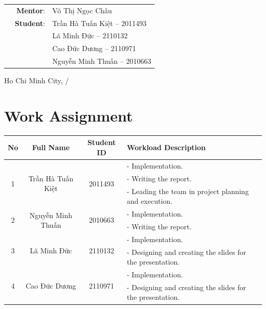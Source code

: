 \documentclass[12pt,a4paper]{article}
\begin{document}
\begin{titlepage}
    \vspace{1cm}
    \begin{table}[H]
        \begin{tabular}{rrl}
        \hspace{5 cm} & \textbf{Mentor}: & Võ Thị Ngọc Châu\\
        
        & \textbf{Student}: & Trần Hà Tuấn Kiệt -- 2011493 \\
        & & Lã Minh Đức -- 2110132 \\
        & & Cao Đức Dương -- 2110971 \\
        & & Nguyễn Minh Thuấn -- 2010663 \\
        
        \end{tabular}
        \end{table}
    \vspace{1cm}

    \begin{center}
        {\large Ho Chi Minh City, \the\month/\the\year}
    \end{center}
\end{titlepage}

\section*{Work Assignment}
\begin{table}[h]
    \centering
    \renewcommand{\arraystretch}{1.5}
    \begin{tabular}{|c|c|c|l|}
    \hline
    \textbf{No} & \textbf{Full Name} & \textbf{Student ID} & \textbf{Workload Description} \\
    \hline 
    \multirow{3}{*}{1} & \multirow{3}{*}{Trần Hà Tuấn Kiệt} & \multirow{3}{*}{2011493} & - Implementation.\\
    & & & - Writing the report.\\
    & & & - Leading the team in project planning and execution. \\
    \hline
    \multirow{2}{*}{2} & \multirow{2}{*}{Nguyễn Minh Thuấn} & \multirow{2}{*}{2010663} & - Implementation.\\
    & & & - Writing the report. \\
    \hline
    \multirow{2}{*}{3} & \multirow{2}{*}{Lã Minh Đức} & \multirow{2}{*}{2110132} & - Implementation.\\
    & & & - Designing and creating the slides for the presentation.\\
    \hline
    \multirow{2}{*}{4} & \multirow{2}{*}{Cao Đức Dương} & \multirow{2}{*}{2110971} & - Implementation.\\
    & & & - Designing and creating the slides for the presentation.\\
    \hline
    \end{tabular}
\end{table}
\end{document}
